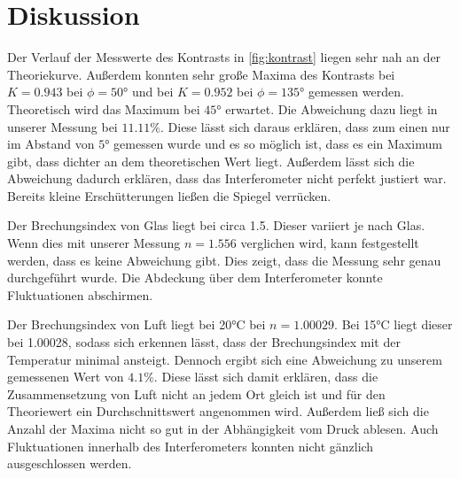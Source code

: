 \section{Diskussion}
\label{sec:Diskussion}

Der Verlauf der Messwerte des Kontrasts in \autoref{fig:kontrast} liegen sehr nah an der Theoriekurve. Außerdem konnten sehr große Maxima 
des Kontrasts bei $K=0.943$ bei $\phi=50°$ und bei $K=0.952$ bei $\phi = 135°$ gemessen werden. Theoretisch wird das Maximum bei $45°$ 
erwartet. Die Abweichung dazu liegt in unserer Messung bei $11.11\%$. Diese lässt sich daraus erklären, dass zum einen nur im Abstand von 
$5°$ gemessen wurde und es so möglich ist, dass es ein Maximum gibt, dass dichter an dem theoretischen Wert liegt. Außerdem lässt sich die 
Abweichung dadurch erklären, dass das Interferometer nicht perfekt justiert war. Bereits kleine Erschütterungen ließen die Spiegel verrücken.

Der Brechungsindex von Glas liegt bei circa 1.5. Dieser variiert je nach Glas.
 Wenn dies mit unserer Messung $n=1.556$ verglichen wird, kann festgestellt werden, dass es keine Abweichung gibt. Dies zeigt, dass die Messung 
sehr genau durchgeführt wurde. Die Abdeckung über dem Interferometer konnte Fluktuationen abschirmen.

Der Brechungsindex von Luft liegt bei 20°C bei $n=1.00029$. Bei 15°C liegt dieser bei 1.00028, sodass sich erkennen lässt, dass der Brechungsindex 
mit der Temperatur minimal ansteigt. Dennoch ergibt sich eine Abweichung zu unserem gemessenen Wert von $4.1\%$. Diese lässt sich damit erklären, 
dass die Zusammensetzung von Luft nicht an jedem Ort gleich ist und für den Theoriewert ein Durchschnittswert angenommen wird. Außerdem 
ließ sich die Anzahl der Maxima nicht so gut in der Abhängigkeit vom Druck ablesen. Auch Fluktuationen innerhalb des Interferometers konnten nicht 
gänzlich ausgeschlossen werden.